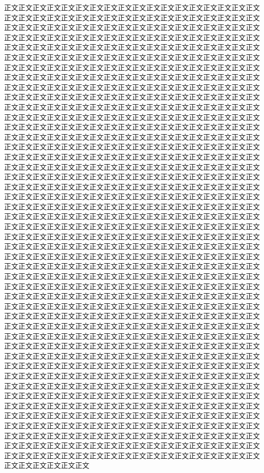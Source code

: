 正文正文正文正文正文正文正文正文正文正文正文正文正文正文正文正文正文正文正文正文正文正文正文正文正文正文正文正文正文正文正文正文正文正文正文正文正文正文正文正文正文正文正文正文正文正文正文正文正文正文正文正文正文正文正文正文正文正文正文正文正文正文正文正文正文正文正文正文正文正文正文正文正文正文正文正文正文正文正文正文正文正文正文正文正文正文正文正文正文正文正文正文正文正文正文正文正文正文正文正文正文正文正文正文正文正文正文正文正文正文正文正文正文正文正文正文正文正文正文正文正文正文正文正文正文正文正文正文正文正文正文正文正文正文正文正文正文正文正文正文正文正文正文正文正文正文正文正文正文正文正文正文正文正文正文正文正文正文正文正文正文正文正文正文正文正文正文正文正文正文正文正文正文正文正文正文正文正文正文正文正文正文正文正文正文正文正文正文正文正文正文正文正文正文正文正文正文正文正文正文正文正文正文正文正文正文正文正文正文正文正文正文正文正文正文正文正文正文正文正文正文正文正文正文正文正文正文正文正文正文正文正文正文正文正文正文正文正文正文正文正文正文正文正文正文正文正文正文正文正文正文正文正文正文正文正文正文正文正文正文正文正文正文正文正文正文正文正文正文正文正文正文正文正文正文正文正文正文正文正文正文正文正文正文正文正文正文正文正文正文正文正文正文正文正文正文正文正文正文正文正文正文正文正文正文正文正文正文正文正文正文正文正文正文正文正文正文正文正文正文正文正文正文正文正文正文正文正文正文正文正文正文正文正文正文正文正文正文正文正文正文正文正文正文正文正文正文正文正文正文正文正文正文正文正文正文正文正文正文正文正文正文正文正文正文正文正文正文正文正文正文正文正文正文正文正文正文正文正文正文正文正文正文正文正文正文正文正文正文正文正文正文正文正文正文正文正文正文正文正文正文正文正文正文正文正文正文正文正文正文正文正文正文正文正文正文正文正文正文正文正文正文正文正文正文正文正文正文正文正文正文正文正文正文正文正文正文正文正文正文正文正文正文正文正文正文正文正文正文正文正文正文正文正文正文正文正文正文正文正文正文正文正文正文正文正文正文正文正文正文正文正文正文正文正文正文正文正文正文正文正文正文正文正文正文正文正文正文正文正文正文正文正文正文正文正文正文正文正文正文正文正文正文正文正文正文正文正文正文正文正文正文正文正文正文正文正文正文正文正文正文正文正文正文正文正文正文正文正文正文正文正文正文正文正文正文正文正文正文正文正文正文正文正文正文正文正文正文正文正文正文正文正文正文正文正文正文正文正文正文正文正文正文正文正文正文正文正文正文正文正文正文正文正文正文正文正文正文正文正文正文正文正文正文正文正文正文正文正文正文正文正文正文正文正文正文正文正文正文正文正文正文正文正文正文正文正文正文正文正文正文正文正文正文正文正文正文正文正文正文正文正文正文正文正文正文正文正文正文正文正文正文正文正文正文正文正文正文正文正文正文正文正文正文正文正文正文正文正文正文正文正文正文正文正文正文正文正文正文正文正文正文正文正文正文正文正文正文正文正文正文正文正文正文正文正文正文正文正文正文正文正文正文正文正文正文正文正文正文正文正文正文正文正文正文正文正文正文正文正文正文正文正文正文正文正文正文正文正文正文正文正文正文正文正文正文正文正文正文正文正文正文正文正文正文正文正文正文正文正文正文正文正文正文正文正文正文正文正文正文正文正文正文正文正文正文正文正文正文正文正文正文正文正文正文正文正文正文正文正文正文正文正文正文正文正文正文正文正文正文正文正文正文正文正文正文正文正文正文正文正文正文正文正文正文正文正文正文正文正文正文正文正文正文正文正文正文正文正文正文正文正文正文正文正文正文正文正文正文正文正文正文正文正文正文正文正文正文正文正文正文正文正文正文正文正文正文正文正文正文正文正文正文正文
